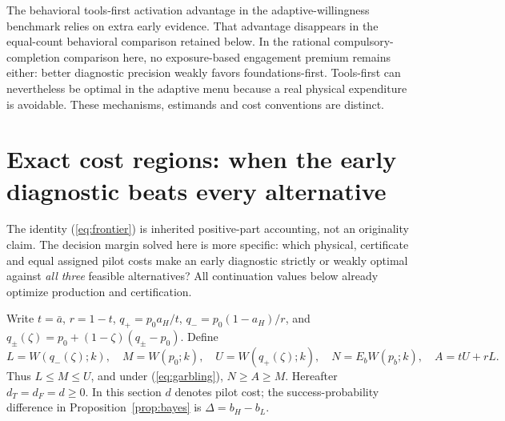 \documentclass[11pt]{article}
\begin{document}
The behavioral tools-first activation advantage in the adaptive-willingness benchmark relies on extra early evidence. That advantage disappears in the equal-count behavioral comparison retained below. In the rational compulsory-completion comparison here, no exposure-based engagement premium remains either: better diagnostic precision weakly favors foundations-first. Tools-first can nevertheless be optimal in the adaptive menu because a real physical expenditure is avoidable. These mechanisms, estimands and cost conventions are distinct.

\section{Exact cost regions: when the early diagnostic beats every alternative}\label{sec:regions}
The identity (\ref{eq:frontier}) is inherited positive-part accounting, not an originality claim. The decision margin solved here is more specific: which physical, certificate and equal assigned pilot costs make an early diagnostic strictly or weakly optimal against \emph{all three} feasible alternatives? All continuation values below already optimize production and certification.

Write $t=\bar a$, $r=1-t$, $q_+=p_0a_H/t$, $q_-=p_0(1-a_H)/r$, and $q_\pm(\zeta)=p_0+(1-\zeta)(q_\pm-p_0)$. Define
\begin{equation}
 L=W(q_-(\zeta);k),\quad M=W(p_0;k),\quad U=W(q_+(\zeta);k),\quad N=E_bW(p_b;k),\quad A=tU+rL.\label{eq:LMUN}
\end{equation}
Thus $L\leq M\leq U$, and under (\ref{eq:garbling}), $N\geq A\geq M$. Hereafter $d_T=d_F=d\geq0$. In this section $d$ denotes pilot cost; the success-probability difference in Proposition~\ref{prop:bayes} is $\Delta=b_H-b_L$.
\end{document}
